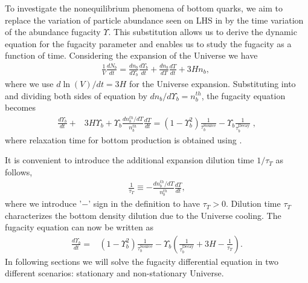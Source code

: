 To investigate the nonequilibrium phenomena of bottom quarks, we aim to replace the variation of particle abundance seen on LHS in  by the time variation of the abundance fugacity $\Upsilon$. This substitution allows us to derive the dynamic equation for the fugacity parameter and enables us to study the fugacity as a function of time. Considering the expansion of the Universe we have
\begin{align}\label{number_dilution}
\frac{1}{V}\frac{dN_b}{dt}=\frac{dn_b}{d\Upsilon_b}\frac{d\Upsilon_b}{dt}+\frac{dn_b}{dT}\frac{dT}{dt}+3Hn_b,\;
\end{align}
where we use $d\ln(V)/dt=3H$ for the Universe expansion. Substituting  into  and dividing both sides of equation by $dn_b/{d\Upsilon_b}=n^{th}_b$, the fugacity equation becomes
\begin{align}
\frac{d\Upsilon_b}{dt}+&3H\Upsilon_b+\Upsilon_b\frac{dn^{th}_b/dT}{n^{th}_b}\frac{dT}{dt}=\left(1-\Upsilon_b^2\right)\frac{1}{\tau_{b}^{\mathrm{Source}}}-\Upsilon_b\frac{1}{\tau^{\mathrm{Decay}}_b}\;,
\end{align}
where relaxation time for bottom production is obtained using . 

It is convenient to introduce the additional expansion dilution time $1/\tau_T$ as follows,
\begin{align}\label{eq:tauT}
\frac{1}{\tau_T}\equiv-\frac{dn^{th}_b/dT}{n^{th}_b}\frac{dT}{dt},
\end{align}
where we introduce '$-$' sign in the definition to have $\tau_T>0$.  Dilution time $\tau_T$ characterizes the bottom density dilution due to the Universe cooling. The fugacity equation can now be written as
\begin{align}\label{Fugacity_Eq0}
\frac{d\Upsilon_b}{dt}\!\!=&(1-\Upsilon_{b}^2)\frac{1}{\tau_{b}^{\mathrm{Source}}}
\!-\!\Upsilon_{b}\left(\frac{1}{\tau^{\mathrm{Decay}}_b}+3H\!-\!\frac{1}{\tau_T}\right).
\end{align}
In following sections we will solve the fugacity differential equation in two different scenarios: stationary and non-stationary Universe.

